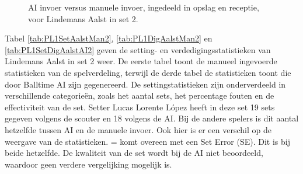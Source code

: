 \begin{figure}[ht]
\centering
{}
\caption{AI invoer versus manuele invoer, ingedeeld in opslag en receptie, voor Lindemans Aalst in set 2.}
\label{fig:PL1ServeReceiveAalst2}
\end{figure}

Tabel \ref{tab:PL1SetAalstMan2}, \ref{tab:PL1DigAalstMan2} en \ref{tab:PL1SetDigAalstAI2} geven de setting- en verdedigingsstatistieken van Lindemans Aalst in set 2 weer. De eerste tabel toont de manueel ingevoerde statistieken van de spelverdeling, terwijl de derde tabel de statistieken toont die door Balltime AI zijn gegenereerd. De settingstatistieken zijn onderverdeeld in verschillende categorieën, zoals het aantal sets, het percentage fouten en de effectiviteit van de set. Setter Lucas Lorente López heeft in deze set 19 sets gegeven volgens de scouter en 18 volgens de AI. Bij de andere spelers is dit aantal hetzelfde tussen AI en de manuele invoer. Ook hier is er een verschil op de weergave van de statistieken. = komt overeen met een Set Error (SE). Dit is bij beide hetzelfde. De kwaliteit van de set wordt bij de AI niet beoordeeld, waardoor geen verdere vergelijking mogelijk is.

